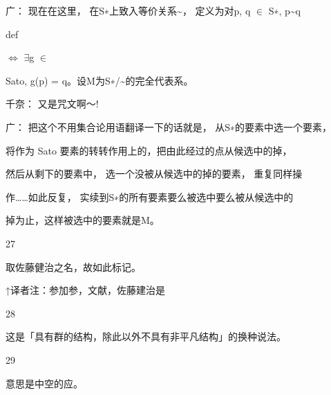 广： 现在在这里， 在S∗上致入等价关系\textasciitilde{}， 定义为对p, q $\in$ S∗, p\textasciitilde{}q\par
def\par
$\Leftrightarrow$ $\exists$g $\in$\par
Sato, g(p) = q。设M为S∗/\textasciitilde{}的完全代表系。\par
千奈： 又是咒文啊～!\par
广： 把这个不用集合论用语翻译一下的话就是， 从S∗的要素中选一个要素，\par
将作为 Sato 要素的转转作用上的，把由此经过的点从候选中的掉，\par
然后从剩下的要素中， 选一个没被从候选中的掉的要素， 重复同样操\par
作……如此反复， 实续到S∗的所有要素要么被选中要么被从候选中的\par
掉为止，这样被选中的要素就是M。\par
27\par
取佐藤健治之名，故如此标记。\par
↑译者注：参加参，文献，佐藤建治是\par
28\par
这是「具有群的结构，除此以外不具有非平凡结构」的换种说法。\par
29\par
意思是中空的应。\par

